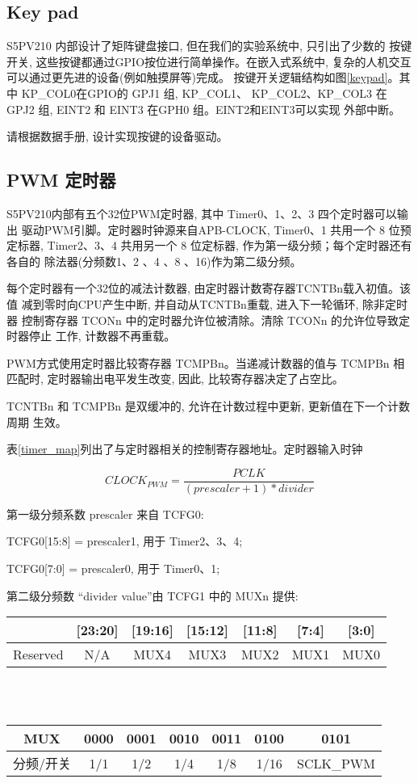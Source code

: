 \subsection{Key pad}
S5PV210 内部设计了矩阵键盘接口, 但在我们的实验系统中, 只引出了少数的
按键开关, 这些按键都通过GPIO按位进行简单操作。在嵌入式系统中, 复杂的人机交互
可以通过更先进的设备(例如触摸屏等)完成。
按键开关逻辑结构如图\ref{keypad}。其中 KP\_COL0在GPIO的 GPJ1 组, KP\_COL1、
KP\_COL2、KP\_COL3 在GPJ2 组, EINT2 和 EINT3 在GPH0 组。EINT2和EINT3可以实现
外部中断。

请根据数据手册, 设计实现按键的设备驱动。

\subsection{PWM 定时器}
S5PV210内部有五个32位PWM定时器, 其中 Timer0、1、2、3 四个定时器可以输出
驱动PWM引脚。定时器时钟源来自APB-CLOCK, Timer0、1 共用一个 8 位预定标器,
Timer2、3、4 共用另一个 8 位定标器, 作为第一级分频；每个定时器还有各自的
除法器(分频数1、2 、4 、8 、16)作为第二级分频。

每个定时器有一个32位的减法计数器, 由定时器计数寄存器TCNTBn载入初值。该值
减到零时向CPU产生中断, 并自动从TCNTBn重载, 进入下一轮循环, 除非定时器
控制寄存器 TCONn 中的定时器允许位被清除。清除 TCONn 的允许位导致定时器停止
工作, 计数器不再重载。

PWM方式使用定时器比较寄存器 TCMPBn。当递减计数器的值与 TCMPBn 相匹配时, 
定时器输出电平发生改变, 因此, 比较寄存器决定了占空比。

TCNTBn 和 TCMPBn 是双缓冲的, 允许在计数过程中更新, 更新值在下一个计数周期
生效。

表\ref{timer_map}列出了与定时器相关的控制寄存器地址。定时器输入时钟

$$ CLOCK_{PWM} = \frac{PCLK}{(prescaler+1)*divider} $$

第一级分频系数 prescaler 来自 TCFG0:

	TCFG0[15:8] = prescaler1, 用于 Timer2、3、4;

	TCFG0[7:0] = prescaler0, 用于 Timer0、1;

	第二级分频数 ``divider value''由 TCFG1 中的 MUXn 提供:

\begin{center}
\begin{tabular}{|c|c|c|c|c|c|c|}
\hline
  [31:24] & [23:20] & [19:16] & [15:12] & [11:8] & [7:4] & [3:0] \\\hline
  Reserved & N/A & MUX4 & MUX3 & MUX2 & MUX1 & MUX0 \\\hline
\end{tabular}
 \ \\ \ \\

\begin{tabular}{|c|c|c|c|c|c|c|}
\hline
    MUX &  0000 & 0001 & 0010 & 0011 & 0100 & 0101 \\\hline
	分频/开关 &1/1 & 1/2 & 1/4 & 1/8 & 1/16 & SCLK\_PWM \\\hline
\end{tabular}
\end{center}

